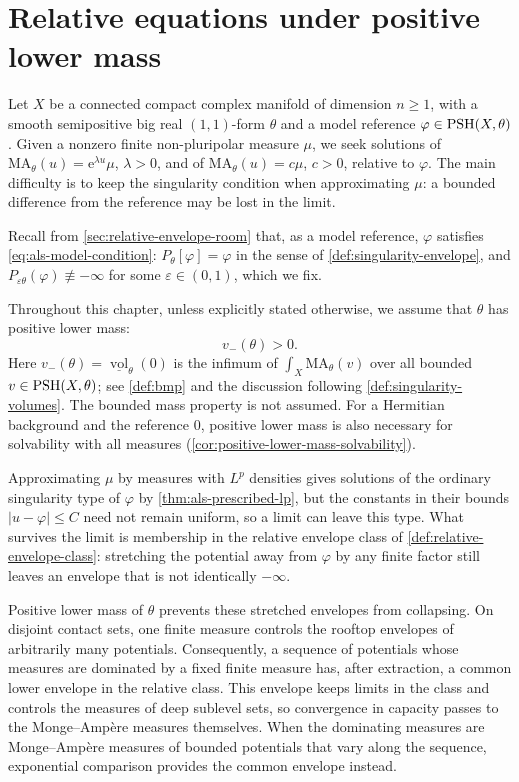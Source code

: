 \chapter{Relative equations under positive lower mass}
\label{chap:relative-finite-measures}

\begingroup
{}

Let $X$ be a connected compact complex manifold of dimension $n\geq1$, with a smooth semipositive big real $(1,1)$-form $\theta$ and a model reference $\varphi\in\mathrm{PSH}(X,\theta)$. Given a nonzero finite non-pluripolar measure $\mu$, we seek solutions of $\mathrm{MA}_\theta(u)=\mathrm{e}^{\lambda u}\mu$, $\lambda>0$, and of $\mathrm{MA}_\theta(u)=c\mu$, $c>0$, relative to $\varphi$. The main difficulty is to keep the singularity condition when approximating $\mu$: a bounded difference from the reference may be lost in the limit.

Recall from \cref{sec:relative-envelope-room} that, as a model reference, $\varphi$ satisfies \eqref{eq:als-model-condition}: $P_\theta[\varphi]=\varphi$ in the sense of \cref{def:singularity-envelope}, and $P_{\varepsilon\theta}(\varphi)\not\equiv-\infty$ for some $\varepsilon\in(0,1)$, which we fix.

Throughout this chapter, unless explicitly stated otherwise, we assume that $\theta$ has positive lower mass:
\begin{equation}\label{eq:relative-positive-lower-volume}
 v_-(\theta)>0.
\end{equation}
Here $v_-(\theta)=\underline{\operatorname{vol}}_\theta(0)$ is the infimum of $\int_X\mathrm{MA}_\theta(v)$ over all bounded $v\in\mathrm{PSH}(X,\theta)$; see \cref{def:bmp} and the discussion following \cref{def:singularity-volumes}. The bounded mass property is not assumed. For a Hermitian background and the reference $0$, positive lower mass is also necessary for solvability with all measures (\cref{cor:positive-lower-mass-solvability}).

Approximating $\mu$ by measures with $L^p$ densities gives solutions of the ordinary singularity type of $\varphi$ by \cref{thm:als-prescribed-lp}, but the constants in their bounds $|u-\varphi|\leq C$ need not remain uniform, so a limit can leave this type. What survives the limit is membership in the relative envelope class of \cref{def:relative-envelope-class}: stretching the potential away from $\varphi$ by any finite factor still leaves an envelope that is not identically $-\infty$.

Positive lower mass of $\theta$ prevents these stretched envelopes from collapsing. On disjoint contact sets, one finite measure controls the rooftop envelopes of arbitrarily many potentials. Consequently, a sequence of potentials whose measures are dominated by a fixed finite measure has, after extraction, a common lower envelope in the relative class. This envelope keeps limits in the class and controls the measures of deep sublevel sets, so convergence in capacity passes to the Monge--Amp\`ere measures themselves. When the dominating measures are Monge--Amp\`ere measures of bounded potentials that vary along the sequence, exponential comparison provides the common envelope instead.

